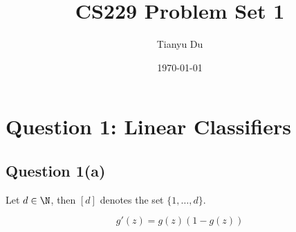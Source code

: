 \documentclass[11pt]{article}
\title{CS229 Problem Set 1}
\date{\today}
\author{Tianyu Du}
\begin{document}
	\maketitle
	\newpage
	\section{Question 1: Linear Classifiers}
	\subsection{Question 1(a)}
	
	\begin{remark}
		Let $d \in \N$, then $[d]$ denotes the set $\{1,\dots, d\}$.
	\end{remark}
	
	\begin{lemma}
		\begin{equation}
			g'(z) = g(z) \left(1-g(z)\right)
		\end{equation}
	\end{lemma}
	
\end{document}
